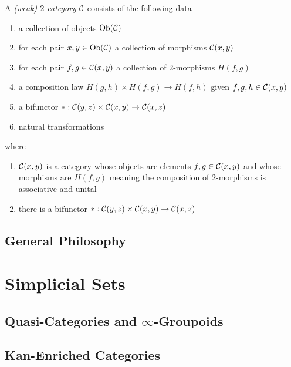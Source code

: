 \documentclass[12pt]{article}
\begin{document}
\begin{defn}
A \textit{(weak) $2$-category} $\mathcal{C}$ consists of the following data
\begin{enumerate}
\item a collection of objects $\mathrm{Ob}(\mathcal{C})$
\item for each pair $x,y \in \mathrm{Ob}(\mathcal{C})$ a collection of morphisms $\mathcal{C}(x,y)$
\item for each pair $f, g \in \mathcal{C}(x,y)$ a collection of $2$-morphisms $H(f, g)$
\item a composition law $H(g,h) \times H(f,g) \to H(f, h)$ given $f,g,h \in \mathcal{C}(x,y)$ 
\item a bifunctor $* : \mathcal{C}(y, z) \times \mathcal{C}(x,y) \to \mathcal{C}(x,z)$
\item natural transformations 
\end{enumerate}
where
\begin{enumerate}
\item $\mathcal{C}(x,y)$ is a category whose objects are elements $f,g \in \mathcal{C}(x,y)$ and whose morphisms are $H(f,g)$ meaning the composition of $2$-morphisms is associative and unital
\item there is a bifunctor $* : \mathcal{C}(y, z) \times \mathcal{C}(x,y) \to \mathcal{C}(x,z)$
\end{enumerate}
\end{defn}

\subsection{General Philosophy}

\section{Simplicial Sets}

\subsection{Quasi-Categories and $\infty$-Groupoids}

\subsection{Kan-Enriched Categories}
 
\end{document}

